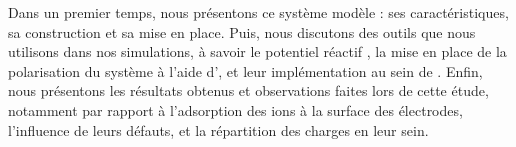 Dans un premier temps, nous présentons ce système modèle : ses caractéristiques, sa construction et sa mise en place.
Puis, nous discutons des outils que nous utilisons dans nos simulations, à savoir le potentiel réactif \reaxff{}\cite{van_duin_reaxff_2001}\cite{russo_atomistic-scale_2011}\cite{senftle_reaxff_2016}, la mise en place de la polarisation du système à l'aide d'\echemdid{}\cite{onofrio_voltage_2015}, et leur implémentation au sein de \lammps{}.
Enfin, nous présentons les résultats obtenus et observations faites lors de cette étude, notamment par rapport à l'adsorption des ions à la surface des électrodes, l'influence de leurs défauts, et la répartition des charges en leur sein.
